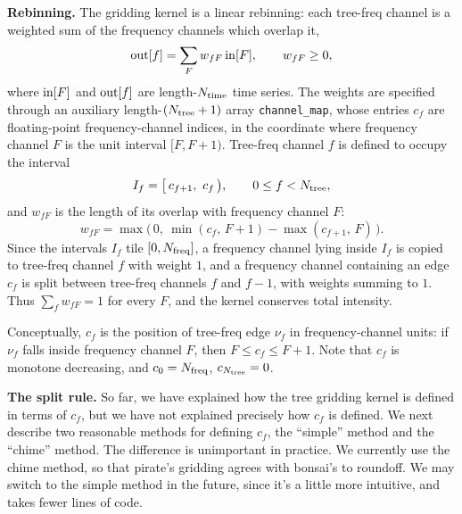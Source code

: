 \documentclass{article}
\numberwithin{equation}{section}   %
\begin{document}
\par\noindent
{\bf Rebinning.}
The gridding kernel is a linear rebinning: each tree-freq channel is a weighted sum of the frequency channels which overlap it,
\begin{equation}
{\rm out}[f] = \sum_F w_{fF}\, {\rm in}[F], \qquad w_{fF} \ge 0,
\end{equation}
where ${\rm in}[F]$ and ${\rm out}[f]$ are length-$N_{\rm time}$ time series.
The weights are specified through an auxiliary length-$(N_{\rm tree}+1)$ array \verb|channel_map|, whose entries $c_f$ are floating-point frequency-channel indices, in the coordinate where frequency channel $F$ is the unit interval $[F, F+1)$.
Tree-freq channel $f$ is defined to occupy the interval
\begin{equation}
I_f = \big[\, c_{f+1},\ c_f \,\big), \qquad 0 \le f < N_{\rm tree},
\label{eq:tg_If_def}
\end{equation}
and $w_{fF}$ is the length of its overlap with frequency channel $F$:
\begin{equation}
w_{fF} = \max\!\big(\,0,\ \min(c_f,\, F+1) - \max(c_{f+1},\, F)\,\big).
\end{equation}
Since the intervals $I_f$ tile $[0, N_{\rm freq}]$, a frequency channel lying inside $I_f$ is copied to tree-freq channel $f$ with weight $1$, and a frequency channel containing an edge $c_f$ is split between tree-freq channels $f$ and $f-1$, with weights summing to $1$.
Thus $\sum_f w_{fF} = 1$ for every $F$, and the kernel conserves total intensity.

Conceptually, $c_f$ is the position of tree-freq edge $\nu_f$ in frequency-channel units: if $\nu_f$ falls inside frequency channel $F$, then $F \le c_f \le F+1$.
Note that $c_f$ is monotone decreasing, and $c_0 = N_{\rm freq}$, $c_{N_{\rm tree}} = 0$.

\par\noindent
{\bf The split rule.}
So far, we have explained how the tree gridding kernel is defined in terms of $c_f$, but we have not explained precisely how $c_f$ is defined.
We next describe two reasonable methods for defining $c_f$, the ``simple'' method and the ``chime'' method.
The difference is unimportant in practice.
We currently use the chime method, so that pirate's gridding agrees with bonsai's to roundoff.
We may switch to the simple method in the future, since it's a little more intuitive, and takes fewer lines of code.
\end{document}
